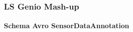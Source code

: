 \documentclass{beamer}
\begin{document}
\begin{frame}
\frametitle{LS Genio Mash-up}
\framesubtitle{Schema Avro SensorDataAnnotation}
\begin{figure}%
	\centering
	\qquad
\end{figure}
\end{frame}
\end{document}
